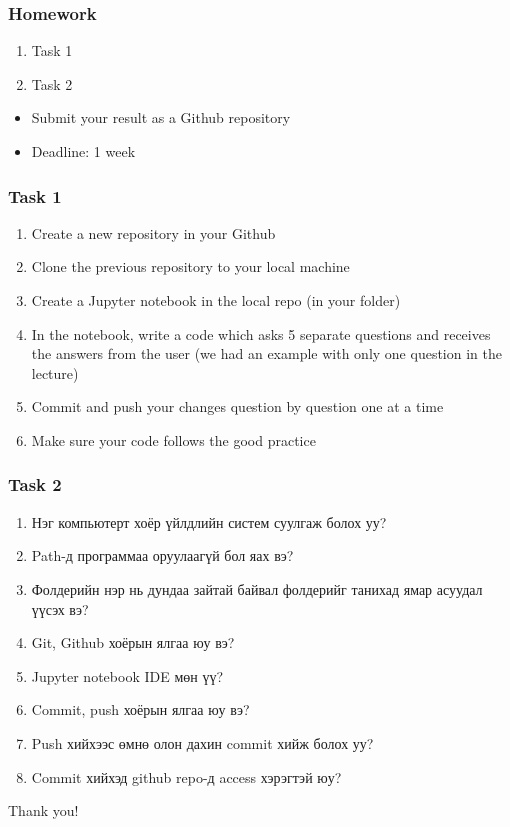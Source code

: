 \documentclass{beamer}
\begin{document}
\begin{frame}
    \frametitle{Homework}
    \begin{enumerate}
        \item Task 1
        \item Task 2
    \end{enumerate}
\vskip 2mm
    \begin{itemize}
        \item Submit your result as a Github repository
        \item Deadline: 1 week%
    \end{itemize}

\end{frame}

\begin{frame}
    \frametitle{Task 1}
    \begin{enumerate}
        \item Create a new repository in your Github
        \item Clone the previous repository to your local machine
        \item Create a Jupyter notebook in the local repo (in your folder)
        \item In the notebook, write a code which asks 5 separate questions and 
        receives the answers from the user (we had an example with only one question
        in the lecture)
        \item Commit and push your changes question by question one at a time
        \item Make sure your code follows the good practice
    \end{enumerate}
\end{frame}

\begin{frame}
    \frametitle{Task 2}
    \begin{enumerate}
        \item Нэг компьютерт хоёр үйлдлийн систем суулгаж болох уу?
        \item Path-д программаа оруулаагүй бол яах вэ?
        \item Фолдерийн нэр нь дундаа зайтай байвал фолдерийг танихад ямар асуудал үүсэх вэ?
        \item Git, Github хоёрын ялгаа юу вэ?
        \item Jupyter notebook IDE мөн үү?
        \item Commit, push хоёрын ялгаа юу вэ?
        \item Push хийхээс өмнө олон дахин commit хийж болох уу?
        \item Commit хийхэд github repo-д access хэрэгтэй юу?
    \end{enumerate}
\end{frame}

\begin{frame}
\Huge{\centerline{Thank you!}}
\end{frame}

\end{document}
